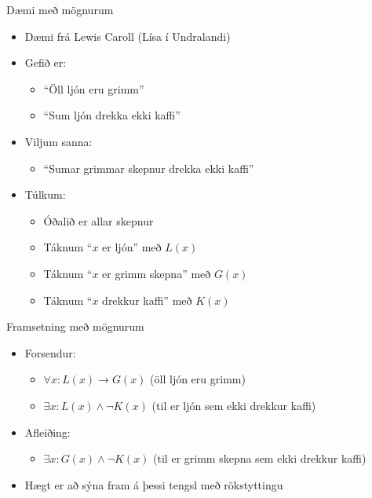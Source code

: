 \documentclass{beamer}
\begin{document}
\begin{frame}{Dæmi með mögnurum}
\begin{itemize}
 \item Dæmi frá Lewis Caroll (Lísa í Undralandi)
 \item Gefið er:
 \begin{itemize}
  \item ``Öll ljón eru grimm''
  \item ``Sum ljón drekka ekki kaffi''
 \end{itemize}
 \item Viljum sanna:
 \begin{itemize}
  \item ``Sumar grimmar skepnur drekka ekki kaffi''
 \end{itemize}
 \item Túlkum:
 \begin{itemize}
  \item Óðalið er allar skepnur
  \item Táknum ``$x$ er ljón'' með $L(x)$
  \item Táknum ``$x$ er grimm skepna'' með $G(x)$
  \item Táknum ``$x$ drekkur kaffi'' með $K(x)$
 \end{itemize}
\end{itemize}
\end{frame}

\begin{frame}{Framsetning með mögnurum}
\begin{itemize}
 \item Forsendur:
 \begin{itemize}
  \item $\forall x: L(x) \to G(x)$ (öll ljón eru grimm)
  \item $\exists x: L(x) \land \lnot K(x)$ (til er ljón sem ekki drekkur kaffi)
 \end{itemize}
 \item Afleiðing:
 \begin{itemize}
  \item $\exists x: G(x) \land \lnot K(x)$ (til er grimm skepna sem ekki drekkur kaffi)
 \end{itemize}
 \item Hægt er að sýna fram á þessi tengsl með rökstyttingu
\end{itemize}
\end{frame}
\end{document}
